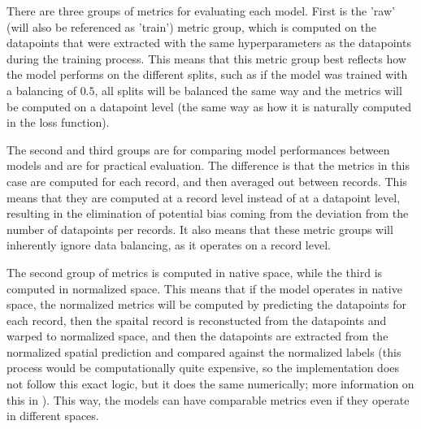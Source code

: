 There are three groups of metrics for evaluating each model. First is the 'raw' (will also be referenced as 'train') metric group, which is computed on the datapoints that were extracted with the same hyperparameters as the datapoints during the training process. This means that this metric group best reflects how the model performs on the different splits, such as if the model was trained with a balancing of $0.5$, all splits will be balanced the same way and the metrics will be computed on a datapoint level (the same way as how it is naturally computed in the loss function).\par
The second and third groups are for comparing model performances between models and are for practical evaluation. The difference is that the metrics in this case are computed for each record, and then averaged out between records. This means that they are computed at a record level instead of at a datapoint level, resulting in the elimination of potential bias coming from the deviation from the number of datapoints per records. It also means that these metric groups will inherently ignore data balancing, as it operates on a record level.\par
The second group of metrics is computed in native space, while the third is computed in normalized space. This means that if the model operates in native space, the normalized metrics will be computed by predicting the datapoints for each record, then the spaital record is reconstucted from the datapoints and warped to normalized space, and then the datapoints are extracted from the normalized spatial prediction and compared against the normalized labels (this process would be computationally quite expensive, so the implementation does not follow this exact logic, but it does the same numerically; more information on this in ). This way, the models can have comparable metrics even if they operate in different spaces.











